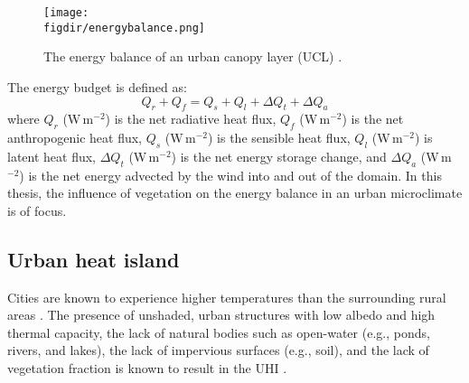 	\begin{figure}[t]
		\centering
		\texttt{[image: \\figdir/energybalance.png]}
		\caption{The energy balance of an urban canopy layer (UCL) \citep{Oke2017a}.}
		\label{fig:energybalance}
	\end{figure}

The energy budget is defined as:
	\begin{equation}
	Q_r + Q_f = Q_s + Q_l + \Delta Q_t + \Delta Q_a
	\end{equation}
where $Q_r$ (W\,m$^{-2}$) is the net radiative heat flux, $Q_f$ (W\,m$^{-2}$) is the net anthropogenic heat flux, $Q_s$ (W\,m$^{-2}$) is the sensible heat flux, $Q_l$ (W\,m$^{-2}$) is latent heat flux, $\Delta Q_t$ (W\,m$^{-2}$) is the net energy storage change, and $\Delta Q_a$ (W\,m$^{-2}$) is the net energy advected by the wind into and out of the domain. In this thesis, the influence of vegetation on the energy balance in an urban microclimate is of focus. 

\subsection{Urban heat island}

Cities are known to experience higher temperatures than the surrounding rural areas \citep{Oke1973,Oke2017a}. The presence of unshaded, urban structures with low albedo and high thermal capacity, the lack of natural bodies such as open-water (e.g., ponds, rivers, and lakes), the lack of impervious surfaces (e.g., soil), and the lack of vegetation fraction is known to result in the UHI \citep{Bowler2010}. 
	
